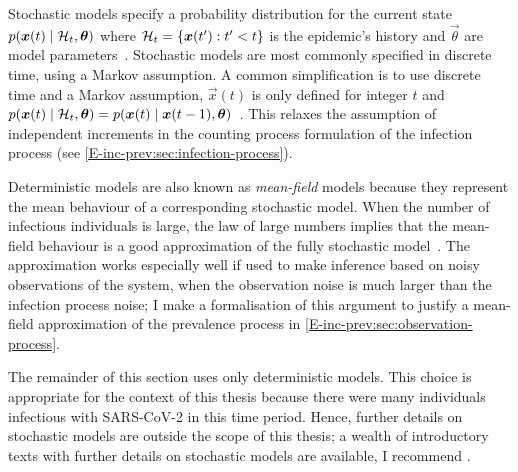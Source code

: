 \documentclass[thesis.tex]{subfiles}
\begin{document}
Stochastic models specify a probability distribution for the current state $p(\bm{x}(t) \mid \mathcal{H}_t, \bm{\theta})$ where $\mathcal{H}_t = \{ \bm{x}(t') : t' < t \}$ is the epidemic's history and $\vec{\theta}$ are model parameters~\autocite{birrellEvidence,dukicTracking,corbellaThesis,keelingModeling}.
Stochastic models are most commonly specified in discrete time, using a Markov assumption.
A common simplification is to use discrete time and a Markov assumption, \ie $\vec{x}(t)$ is only defined for integer $t$ and $p(\bm{x}(t) \mid \mathcal{H}_t, \bm{\theta}) = p(\bm{x}(t) \mid \bm{x}(t-1), \bm{\theta})$~\autocite{birrellEvidence}.
This relaxes the assumption of independent increments in the counting process formulation of the infection process (see \cref{E-inc-prev:sec:infection-process}).

Deterministic models are also known as \emph{mean-field} models because they represent the mean behaviour of a corresponding stochastic model.
When the number of infectious individuals is large, the law of large numbers implies that the mean-field behaviour is a good approximation of the fully stochastic model~\autocite[20]{diekmannMathematical}.
The approximation works especially well if used to make inference based on noisy observations of the system, when the observation noise is much larger than the infection process noise; I make a formalisation of this argument to justify a mean-field approximation of the prevalence process in \cref{E-inc-prev:sec:observation-process}.

The remainder of this section uses only deterministic models.
This choice is appropriate for the context of this thesis because there were many individuals infectious with SARS-CoV-2 in this time period.
Hence, further details on stochastic models are outside the scope of this thesis; a wealth of introductory texts with further details on stochastic models are available, I recommend \textcite[chapter 6]{keelingModeling}.

\end{document}
